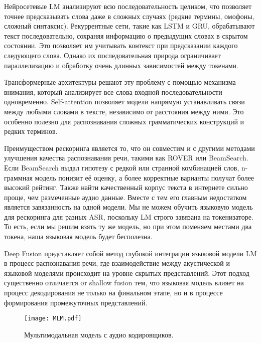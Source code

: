 Нейросетевые LM анализируют всю последовательность целиком, что позволяет точнее предсказывать слова даже в сложных случаях (редкие термины, омофоны, сложный синтаксис).
Рекуррентные сети, такие как LSTM и GRU, обрабатывают текст последовательно, сохраняя информацию о предыдущих словах в скрытом состоянии.
Это позволяет им учитывать контекст при предсказании каждого следующего слова.
Однако их последовательная природа ограничивает параллелизацию и обработку очень длинных зависимостей между токенами.

Трансформерные архитектуры решают эту проблему с помощью механизма внимания, который анализирует все слова входной последовательности одновременно.
Self-attention позволяет модели напрямую устанавливать связи между любыми словами в тексте, независимо от расстояния между ними.
Это особенно полезно для распознавания сложных грамматических конструкций и редких терминов.

Преимуществом рескоринга является то, что он совместим и с другими методами улучшения качества распознавания речи, такими как ROVER или BeamSearch.
Если BeamSearch выдал гипотезу с редкой или странной комбинацией слов, n-граммная модель понизит её оценку, а более корректные варианты получат более высокий рейтинг.
Также найти качественный корпус текста в интернете сильно проще, чем размеченные аудио данные.
Вместе с тем его главным недостатком является завязанность на одной модели.
Мы не можем обучить языковую модель для рескоринга для разных ASR, поскольку LM строго завязана на токенизаторе.
То есть, если мы решим взять ту же модель, но при этом поменяем местами два токена, наша языковая модель будет бесполезна.

Deep Fusion представляет собой метод глубокой интеграции языковой модели LM в процесс распознавания речи, где взаимодействие между акустической и языковой моделями происходит на уровне скрытых представлений.
Этот подход существенно отличается от shallow fusion тем, что языковая модель влияет на процесс декодирования не только на финальном этапе, но и в процессе формирования промежуточных представлений.

\begin{figure}[!t]
  \centering
  \texttt{[image: MLM.pdf]}
  \caption{Мультимодальная модель с аудио кодировщиков.}
  \label{fig:mlm}
\end{figure}

